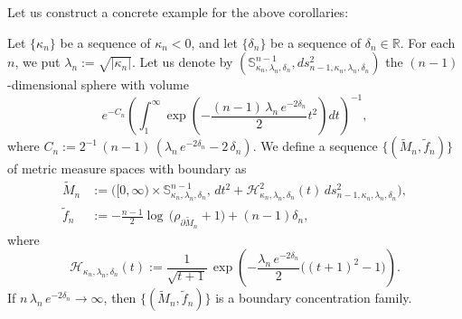 Let us construct a concrete example for the above corollaries:
\begin{ex}\label{ex:one dimensional example}
Let $\{\kappa_{n}\}$ be a sequence of $\kappa_{n}<0$,
and let $\{\delta_{n}\}$ be a sequence of $\delta_{n}\in \mathbb{R}$.
For each $n$,
we put $\lambda_{n}:=\sqrt{\vert \kappa_{n} \vert}$.
Let us denote by $(    \mathbb{S}^{n-1}_{\kappa_{n},\lambda_{n},\delta_{n}}, ds^{2}_{n-1,\kappa_{n},\lambda_{n},\delta_{n}})$ the $(n-1)$-dimensional sphere with volume
\begin{equation*}
e^{-C_{n}}  \left(\int^{\infty}_{1}\exp\left(-\frac{(n-1)\,\lambda_{n}\,e^{-2\delta_{n}}}{2}t^{2}\right)dt \right)^{-1},
\end{equation*}
where $C_{n}:=2^{-1}\,(n-1)\,(\lambda_{n}\,e^{-2\delta_{n}}-2\,\delta_{n})$.
We define a sequence $\{(\widetilde{M}_{n},\widetilde{f}_{n})\}$ of metric measure spaces with boundary as
\begin{align*}
\widetilde{M}_{n}&:=\bigl([0,\infty) \times \mathbb{S}^{n-1}_{\kappa_{n},\lambda_{n},\delta_{n}}, \,dt^{2}+\mathcal{H}^{2}_{\kappa_{n},\lambda_{n},\delta_{n}}(t)\,ds^{2}_{n-1,\kappa_{n},\lambda_{n},\delta_{n}}\bigl),\\
\widetilde{f}_{n}&:=-\frac{n-1}{2} \log\, \bigl(\rho_{\partial \widetilde{M}_{n}}+1\bigl)+(n-1)\delta_{n},
\end{align*}
where
\begin{equation*}
\mathcal{H}_{\kappa_{n},\lambda_{n},\delta_{n}}(t):=\frac{1}{\sqrt{t+1}} \,\exp \left(-\frac{\lambda_{n}\,e^{-2\delta_{n}}}{2}\bigl((t+1)^{2}-1\bigl) \right).
\end{equation*}
If $n\,\lambda_{n}\,e^{-2\delta_{n}}\to \infty$,
then $\{(\widetilde{M}_{n},\widetilde{f}_{n})\}$ is a boundary concentration family.


\end{ex}
